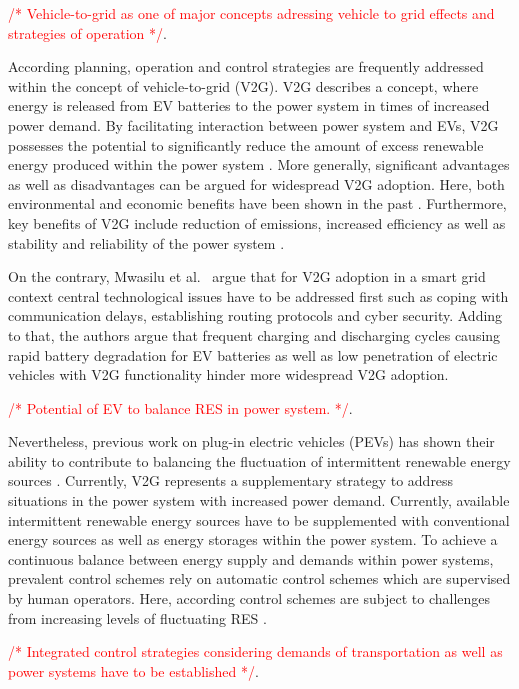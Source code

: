 \documentclass[conference]{IEEEtran}
\newcommand{\todo}[1]{\textcolor{red}{/* #1 */}}
\begin{document}
	\todo{Vehicle-to-grid as one of major concepts adressing vehicle to grid effects and strategies of operation}. 
	
	According planning, operation and control strategies are frequently addressed within the concept of vehicle-to-grid (V2G). V2G describes a concept, where energy is released from EV batteries to the power system in times of increased power demand.  By facilitating interaction between power system and EVs, V2G possesses the potential to significantly reduce the amount of excess renewable energy produced within the power system \cite{richardson2013electric}. More generally, significant advantages as well as disadvantages can be argued for widespread V2G adoption. Here, both environmental and economic benefits have been shown in the past \cite{faria2012sustainability, richardson2013electric, mwasilu2014electric}. Furthermore, key benefits of V2G include reduction of emissions, increased efficiency as well as stability and reliability of the power system \cite{yilmaz2013review}.
	
	On the contrary, Mwasilu et al.~\cite{mwasilu2014electric} argue that for V2G adoption in a smart grid context central technological issues have to be addressed first such as coping with communication delays, establishing routing protocols and cyber security. Adding to that, the authors argue that frequent charging and discharging cycles causing rapid battery degradation for EV batteries as well as low penetration of electric vehicles with V2G functionality hinder more widespread V2G adoption.
	
	\todo{Potential of EV to balance RES in power system.}. 
	
	Nevertheless, previous work on plug-in electric vehicles (PEVs) has shown their ability to contribute to balancing the fluctuation of intermittent renewable energy sources \cite{dallinger2012grid}. Currently, V2G represents a supplementary strategy to address situations in the power system with increased power demand. Currently, available intermittent renewable energy sources have to be supplemented with conventional energy sources as well as energy storages within the power system. To achieve a continuous balance between energy supply and demands within power systems, prevalent control schemes rely on automatic control schemes which are supervised by human operators. Here, according control schemes are subject to challenges from increasing levels of fluctuating RES \cite{heussen2012unified}.
	
	\todo{Integrated control strategies considering demands of transportation as well as power systems have to be established}. 
	
\end{document}
